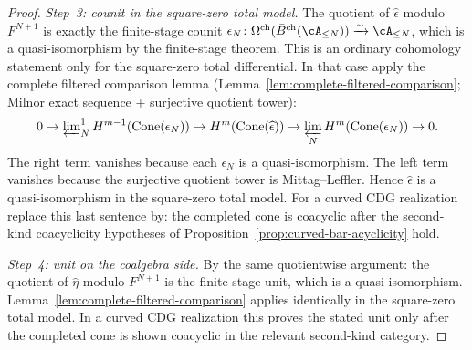 \begin{proof}
\emph{Step~3: counit in the square-zero total model.}
The quotient of $\widehat\epsilon$ modulo $F^{N+1}$ is exactly the
finite-stage counit $\epsilon_N\colon
\Omega^{\mathrm{ch}}(\bar B^{\mathrm{ch}}(\cA_{\le N}))
\xrightarrow{\sim} \cA_{\le N}$, which is a quasi-isomorphism by the
finite-stage theorem. This is an ordinary cohomology statement only
for the square-zero total differential. In that case apply the
complete filtered comparison lemma
(Lemma~\ref{lem:complete-filtered-comparison}; Milnor exact sequence +
surjective quotient tower):
\[
0 \to \varprojlim\nolimits^1_N H^{m-1}(\operatorname{Cone}(\epsilon_N))
\to H^m(\operatorname{Cone}(\widehat\epsilon))
\to \varprojlim_N H^m(\operatorname{Cone}(\epsilon_N)) \to 0.
\]
The right term vanishes because each $\epsilon_N$ is a quasi-isomorphism.
The left term vanishes because the surjective quotient tower is
Mittag--Leffler. Hence $\widehat\epsilon$ is a quasi-isomorphism in
the square-zero total model. For a curved CDG realization replace this
last sentence by: the completed cone is coacyclic after the
second-kind coacyclicity hypotheses of
Proposition~\ref{prop:curved-bar-acyclicity} hold.

\emph{Step~4: unit on the coalgebra side.}
By the same quotientwise argument: the quotient of $\widehat\eta$ modulo
$F^{N+1}$ is the finite-stage unit, which is a quasi-isomorphism.
Lemma~\ref{lem:complete-filtered-comparison} applies identically in
the square-zero total model. In a curved CDG realization this proves
the stated unit only after the completed cone is shown coacyclic in
the relevant second-kind category.
\end{proof}

